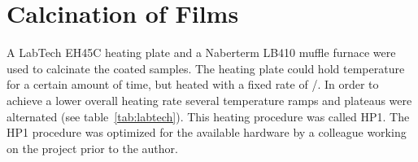 \section{Calcination of Films}\label{sec:exp-calc}
A LabTech EH45C heating plate and a Naberterm LB410 muffle furnace were used to calcinate the coated samples. 
The heating plate could hold temperature for a certain amount of time, but heated with a fixed rate of /\minutes{}.
In order to achieve a lower overall heating rate several temperature ramps and plateaus were alternated (see table~\ref{tab:labtech}). %
This heating procedure was called HP1.
The HP1 procedure was optimized for the available hardware by a colleague working on the 
project prior to the author.

